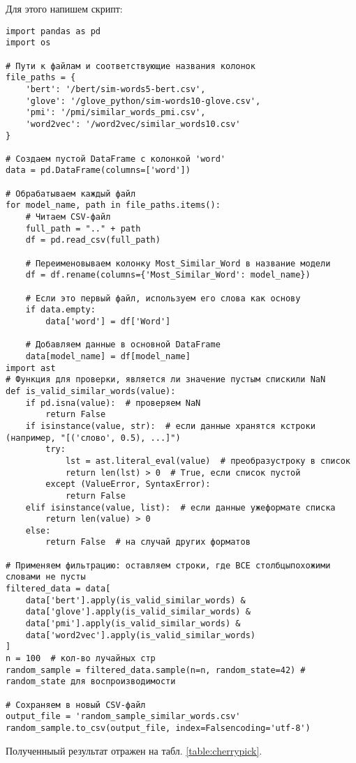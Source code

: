 \documentclass[coursework]{SCWorks}
\begin{document}
Для этого напишем скрипт:
\begin{verbatim}
import pandas as pd
import os

# Пути к файлам и соответствующие названия колонок
file_paths = {
    'bert': '/bert/sim-words5-bert.csv',
    'glove': '/glove_python/sim-words10-glove.csv',
    'pmi': '/pmi/similar_words_pmi.csv',
    'word2vec': '/word2vec/similar_words10.csv'
}

# Создаем пустой DataFrame с колонкой 'word'
data = pd.DataFrame(columns=['word'])

# Обрабатываем каждый файл
for model_name, path in file_paths.items():
    # Читаем CSV-файл
    full_path = ".." + path
    df = pd.read_csv(full_path)
    
    # Переименовываем колонку Most_Similar_Word в название модели
    df = df.rename(columns={'Most_Similar_Word': model_name})
    
    # Если это первый файл, используем его слова как основу
    if data.empty:
        data['word'] = df['Word']
    
    # Добавляем данные в основной DataFrame
    data[model_name] = df[model_name]
import ast
# Функция для проверки, является ли значение пустым спискили NaN
def is_valid_similar_words(value):
    if pd.isna(value):  # проверяем NaN
        return False
    if isinstance(value, str):  # если данные хранятся кстроки (например, "[('слово', 0.5), ...]")
        try:
            lst = ast.literal_eval(value)  # преобразустроку в список
            return len(lst) > 0  # True, если список пустой
        except (ValueError, SyntaxError):
            return False
    elif isinstance(value, list):  # если данные ужеформате списка
        return len(value) > 0
    else:
        return False  # на случай других форматов

# Применяем фильтрацию: оставляем строки, где ВСЕ столбцыпохожими словами не пусты
filtered_data = data[
    data['bert'].apply(is_valid_similar_words) &
    data['glove'].apply(is_valid_similar_words) &
    data['pmi'].apply(is_valid_similar_words) &
    data['word2vec'].apply(is_valid_similar_words)
]
n = 100  # кол-во лучайных стр
random_sample = filtered_data.sample(n=n, random_state=42) # random_state для воспроизводимости

# Сохраняем в новый CSV-файл
output_file = 'random_sample_similar_words.csv'
random_sample.to_csv(output_file, index=Falsencoding='utf-8')
\end{verbatim}

Полученныый результат отражен на табл. \ref{table:cherrypick}.
\end{document}
